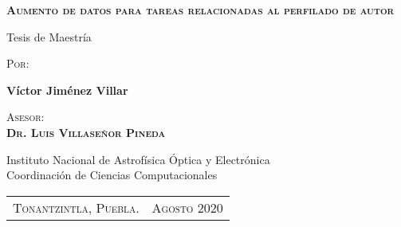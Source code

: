 \begin{titlepage}
\begin{center}
{\Large \scshape \bf Aumento de datos para tareas relacionadas al perfilado de autor}
\end{center}

\vspace*{\fill}
\begin{center}
{Tesis de Maestría}
\end{center}

\vspace*{\fill}
\begin{center}
{\large \scshape Por:}
\end{center}

\begin{center}
{\Large \bf Víctor Jiménez Villar}
\end{center}

\vspace*{\fill}
\begin{center}
{\scshape Asesor:}\\
{\bf \scshape Dr. Luis Villaseñor Pineda} 
\end{center}

\vspace*{\fill}
\begin{center}
{Instituto Nacional de Astrof\'{i}sica \'{O}ptica y Electr\'{o}nica}\\
{Coordinaci\'{o}n de Ciencias Computacionales}
\end{center}

\vspace*{\fill}
\begin{center}
\begin{tabular}{cc}
\multicolumn{1}{p{2.5in}}{\centering \scriptsize
\textsc{Tonantzintla, Puebla.}}&
\multicolumn{1}{p{2.5in}}{\centering \scriptsize \textsc{Agosto 2020}}\\
\end{tabular}
\end{center}
\end{titlepage}
